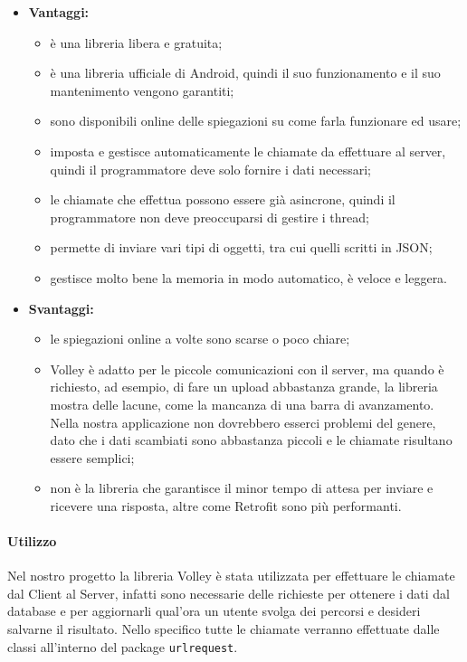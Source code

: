 	\begin{itemize}
		\item \textbf{Vantaggi:}
			\begin{itemize}
				\item è una libreria libera e gratuita;
				\item è una libreria ufficiale di Android, quindi il suo funzionamento e il suo mantenimento vengono garantiti;
				\item sono disponibili online delle spiegazioni su come farla funzionare ed usare;
				\item imposta e gestisce automaticamente le chiamate da effettuare al server, quindi il programmatore deve solo fornire i dati necessari;
				\item le chiamate che effettua possono essere già asincrone, quindi il programmatore non deve preoccuparsi di gestire i thread;
				\item permette di inviare vari tipi di oggetti, tra cui quelli scritti in JSON;
				\item gestisce molto bene la memoria in modo automatico, è veloce e leggera.
			\end{itemize}
		\item \textbf{Svantaggi:}
			\begin{itemize}
				\item le spiegazioni online a volte sono scarse o poco chiare;
				\item Volley è adatto per le piccole comunicazioni con il server, ma quando è richiesto, ad esempio, di fare un upload abbastanza grande, la libreria mostra delle lacune, come la mancanza di una barra di avanzamento. Nella nostra applicazione non dovrebbero esserci problemi del genere, dato che i dati scambiati sono abbastanza piccoli e le chiamate risultano essere semplici;
				\item non è la libreria che garantisce il minor tempo di attesa per inviare e ricevere una risposta, altre come Retrofit sono più performanti.
			\end{itemize}
	\end{itemize}
	\paragraph{Utilizzo}
	Nel nostro progetto la libreria Volley è stata utilizzata per effettuare le chiamate dal Client al Server, infatti sono necessarie delle richieste per ottenere i dati dal database e per aggiornarli qual'ora un utente svolga dei percorsi e desideri salvarne il risultato.
	Nello specifico tutte le chiamate verranno effettuate dalle classi all'interno del package \texttt{urlrequest}.
	
	
	
	
	